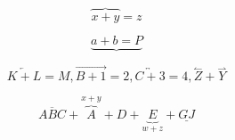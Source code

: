 \documentclass{book}
\begin{document}
$$\overbrace{x+y}=z$$

$$\underbrace{a+b=P}$$

$$\overleftarrow{K+L}=M , \overrightarrow{B+1}=2, \overleftrightarrow{C+3}=4, \overset{\leftharpoonup}{Z}+\overset{\rightharpoonup}{Y}$$

$$\overline{ABC}+\overset{x+y}{\overbrace{A}}+D+\underset{w+z}{\underbrace{E}}+\underline{GJ}$$
\end{document}
